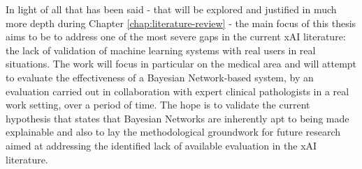 In light of all that has been said - that will be explored and justified in much more depth during Chapter \ref{chap:literature-review} - the main focus of this thesis aims to be to address one of the most severe gaps in the current xAI literature: the lack of validation of machine learning systems with real users in real situations.
The work will focus in particular on the medical area and will attempt to evaluate the effectiveness of a Bayesian Network-based system, by an evaluation carried out in collaboration with expert clinical pathologists in a real work setting, over a period of time.
The hope is to validate the current hypothesis that states that Bayesian Networks are inherently apt to being made explainable and also to lay the methodological groundwork for future research aimed at addressing the identified lack of available evaluation in the xAI literature.